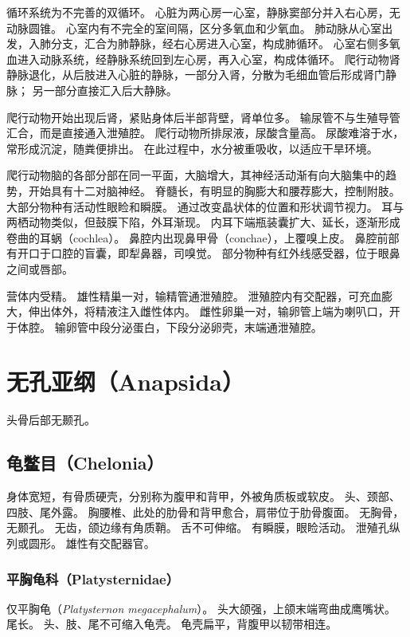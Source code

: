\documentclass[11pt]{article}
\begin{document}
\newline

循环系统为不完善的双循环。
心脏为两心房一心室，静脉窦部分并入右心房，无动脉圆锥。
心室内有不完全的室间隔，区分多氧血和少氧血。
肺动脉从心室出发，入肺分支，汇合为肺静脉，经右心房进入心室，构成肺循环。
心室右侧多氧血进入动脉系统，经静脉系统回到左心房，再入心室，构成体循环。
爬行动物肾静脉退化，从后肢进入心脏的静脉，一部分入肾，分散为毛细血管后形成肾门静脉；
另一部分直接汇入后大静脉。

\newline

爬行动物开始出现后肾，紧贴身体后半部背壁，肾单位多。
输尿管不与生殖导管汇合，而是直接通入泄殖腔。
爬行动物所排尿液，尿酸含量高。
尿酸难溶于水，常形成沉淀，随粪便排出。
在此过程中，水分被重吸收，以适应干旱环境。

\newline

爬行动物脑的各部分部在同一平面，大脑增大，其神经活动渐有向大脑集中的趋势，开始具有十二对脑神经。
脊髓长，有明显的胸膨大和腰荐膨大，控制附肢。
大部分物种有活动性眼睑和瞬膜。
通过改变晶状体的位置和形状调节视力。
耳与两栖动物类似，但鼓膜下陷，外耳渐现。
内耳下端瓶装囊扩大、延长，逐渐形成卷曲的耳蜗（cochlea）。
鼻腔内出现鼻甲骨（conchae），上覆嗅上皮。
鼻腔前部有开口于口腔的盲囊，即犁鼻器，司嗅觉。
部分物种有红外线感受器，位于眼鼻之间或唇部。

\newline

营体内受精。
雄性精巢一对，输精管通泄殖腔。
泄殖腔内有交配器，可充血膨大，伸出体外，将精液注入雌性体内。
雌性卵巢一对，输卵管上端为喇叭口，开于体腔。
输卵管中段分泌蛋白，下段分泌卵壳，末端通泄殖腔。

\section{无孔亚纲（Anapsida）}
头骨后部无颞孔。

\subsection{龟鳖目（Chelonia）}
身体宽短，有骨质硬壳，分别称为腹甲和背甲，外被角质板或软皮。
头、颈部、四肢、尾外露。
胸腰椎、此处的肋骨和背甲愈合，肩带位于肋骨腹面。
无胸骨，无颞孔。
无齿，颌边缘有角质鞘。
舌不可伸缩。
有瞬膜，眼睑活动。
泄殖孔纵列或圆形。
雄性有交配器官。

\subsubsection{平胸龟科（Platysternidae）}
仅平胸龟（\textit{Platysternon megacephalum}）。
头大颌强，上颌末端弯曲成鹰嘴状。
尾长。
头、肢、尾不可缩入龟壳。
龟壳扁平，背腹甲以韧带相连。
\end{document}
